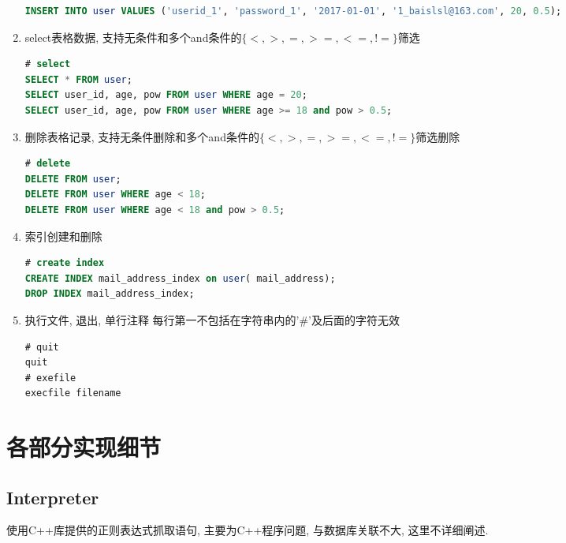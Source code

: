 \documentclass[10pt]{article}
\begin{document}
\begin{CJK}{UTF8}{gkai}
\begin{enumerate}
		\begin{lstlisting}[language = sql]
INSERT INTO user VALUES ('userid_1', 'password_1', '2017-01-01', '1_baislsl@163.com', 20, 0.5);		
		\end{lstlisting}
		\item select表格数据, 支持无条件和多个and条件的$\{<, >, =, >=, <=, !=\}$筛选
		\begin{lstlisting}[language = sql]
# select
SELECT * FROM user;
SELECT user_id, age, pow FROM user WHERE age = 20;
SELECT user_id, age, pow FROM user WHERE age >= 18 and pow > 0.5;		
		\end{lstlisting}
		\item 删除表格记录, 支持无条件删除和多个and条件的$\{<, >, =, >=, <=, !=\}$筛选删除
		\begin{lstlisting}[language = sql]
# delete 
DELETE FROM user;
DELETE FROM user WHERE age < 18;
DELETE FROM user WHERE age < 18 and pow > 0.5;		
		\end{lstlisting}
		\item 索引创建和删除
		\begin{lstlisting}[language = sql]
# create index 
CREATE INDEX mail_address_index on user( mail_address);
DROP INDEX mail_address_index;
		\end{lstlisting}
		\item 执行文件, 退出, 单行注释 每行第一不包括在字符串内的'\#'及后面的字符无效
		\begin{lstlisting}[language = sql]
# quit
quit
# exefile
execfile filename
		\end{lstlisting}
	\end{enumerate}
	
	\section{各部分实现细节}
		\subsection{Interpreter}
		使用C++库提供的正则表达式抓取语句, 主要为C++程序问题, 与数据库关联不大, 这里不详细阐述.
		

\end{CJK}
\end{document}
